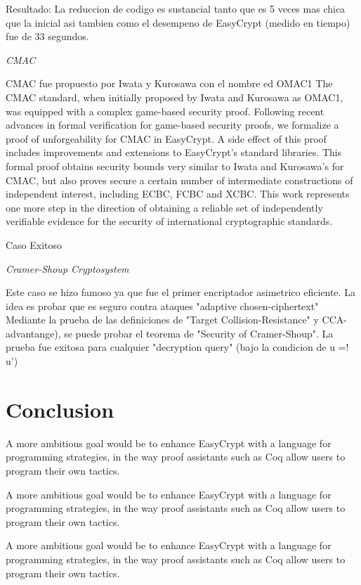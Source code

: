\documentclass[runningheads,a4paper]{llncs}
\begin{document}
Resultado: La reduccion de codigo es sustancial tanto que es 5 veces mas chica que la inicial asi tambien como el desempeno de EasyCrypt (medido en tiempo) fue de 33 segundos.\cite{article5}


\centerline{\emph{CMAC}}
\cite{article7}
CMAC fue propuesto por Iwata y Kurosawa con el nombre ed OMAC1
The CMAC standard, when initially proposed by
Iwata and Kurosawa as OMAC1, was equipped with a complex
game-based security proof. Following recent advances in formal
verification for game-based security proofs, we formalize a proof
of unforgeability for CMAC in EasyCrypt. A side effect of
this proof includes improvements and extensions to EasyCrypt’s
standard libraries. This formal proof obtains security bounds
very similar to Iwata and Kurosawa’s for CMAC, but also
proves secure a certain number of intermediate constructions of
independent interest, including ECBC, FCBC and XCBC. This
work represents one more step in the direction of obtaining a
reliable set of independently verifiable evidence for the security
of international cryptographic standards.

Caso Exitoso

\centerline{\emph{Cramer-Shoup Cryptosystem}}

Este caso se hizo famoso ya que fue el primer encriptador asimetrico eficiente. La idea es probar que es seguro contra ataques "adaptive chosen-ciphertext"
Mediante la prueba de las definiciones de "Target Collision-Resistance" y CCA-advantange), se puede probar el teorema de "Security of Cramer-Shoup".
La prueba fue exitosa para cualquier "decryption query" (bajo la condicion de u =! u')\cite{article5}


\section{Conclusion}

A more ambitious goal
would be to enhance EasyCrypt with a language for programming strategies, in
the way proof assistants such as Coq allow users to program their own tactics.

A more ambitious goal
would be to enhance EasyCrypt with a language for programming strategies, in
the way proof assistants such as Coq allow users to program their own tactics.

A more ambitious goal
would be to enhance EasyCrypt with a language for programming strategies, in
the way proof assistants such as Coq allow users to program their own tactics.
\end{document}
